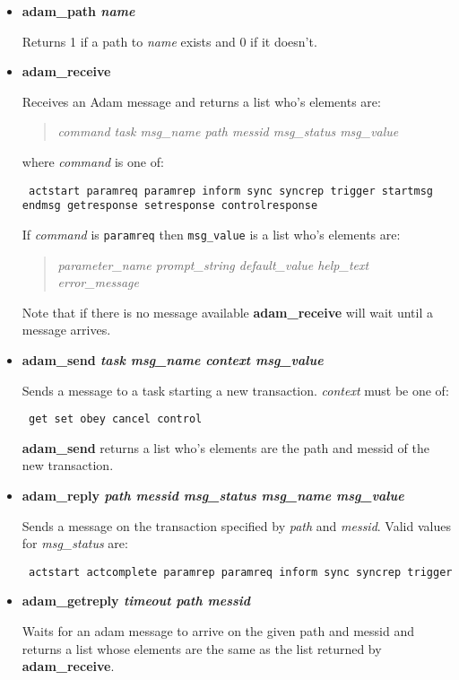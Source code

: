 \begin{itemize}

\item {\bf adam\_path \em name}

Returns 1 if a path to {\em name} exists and 0 if it doesn't.

\item {\bf adam\_receive }

Receives an Adam message and returns a list who's
elements are:
\begin{quote}{\em
command task msg\_name path messid msg\_status msg\_value
}\end{quote}
where {\em command} is one of:
\begin{tquote}{\tt
actstart paramreq paramrep inform sync syncrep trigger startmsg 
endmsg getresponse setresponse controlresponse
}\end{tquote}
If {\em command} is {\tt paramreq} then {\tt msg\_value} is a list who's
elements are:
\begin{quote}{\em
parameter\_name prompt\_string default\_value help\_text error\_message
}\end{quote}
Note that if there is no message available {\bf adam\_receive} will wait
until a message arrives.

\item {\bf adam\_send {\em task msg\_name context msg\_value} }

Sends a message to a task starting a new transaction. {\em context}
must be one of:

\begin{tquote}{\tt
get set obey cancel control
}\end{tquote}
{\bf adam\_send} returns a list who's elements are the path and messid of
the new transaction.

\item {\bf adam\_reply {\em path messid msg\_status msg\_name msg\_value}}

Sends a message on the transaction specified by {\em path} and
{\em{messid}}.  Valid values for {\em msg\_status} are:

\begin{tquote}{\tt
actstart actcomplete paramrep paramreq inform sync syncrep trigger
}\end{tquote}

\item {\bf adam\_getreply {\em timeout path messid}}

Waits for an adam message to arrive on the given path and messid and
returns a list whose elements are the same as the list returned by {\bf
adam\_receive}.

\end{itemize}


